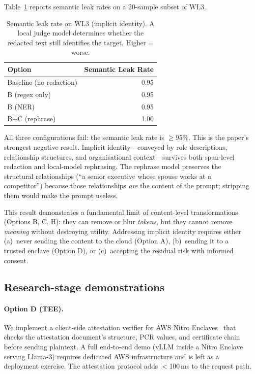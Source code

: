 \documentclass[11pt,a4paper]{article}
\begin{document}
Table~\ref{tab:semantic} reports semantic leak rates on a
20-sample subset of WL3.

\begin{table}[h]
\centering
\small
\caption{Semantic leak rate on WL3 (implicit identity).
  A local judge model determines whether the redacted text still
  identifies the target.  Higher = worse.}
\label{tab:semantic}
\begin{tabular}{lr}
\toprule
Option & Semantic Leak Rate \\
\midrule
Baseline (no redaction) & 0.95 \\
B (regex only)          & 0.95 \\
B (NER)                 & 0.95 \\
B+C (rephrase)          & 1.00 \\
\bottomrule
\end{tabular}
\end{table}

All three configurations fail: the semantic leak rate is
$\geq$95\%.  This is the paper's strongest negative result.
Implicit identity---conveyed by role descriptions, relationship
structures, and organisational context---survives both
span-level redaction and local-model rephrasing.  The rephrase
model preserves the structural relationships (``a senior
executive whose spouse works at a competitor'') because those
relationships \emph{are} the content of the prompt; stripping
them would make the prompt useless.

This result demonstrates a fundamental limit of content-level
transformations (Options B, C, H): they can remove or blur
\emph{tokens}, but they cannot remove \emph{meaning} without
destroying utility.  Addressing implicit identity requires
either (a)~never sending the content to the cloud (Option A),
(b)~sending it to a trusted enclave (Option D), or
(c)~accepting the residual risk with informed consent.

\subsection{Research-stage demonstrations}

\paragraph{Option D (TEE).}
We implement a client-side attestation verifier for AWS Nitro
Enclaves~\cite{nitro-enclaves} that checks the attestation
document's structure, PCR
values, and certificate chain before sending plaintext.  A full
end-to-end demo (vLLM inside a Nitro Enclave serving Llama-3)
requires dedicated AWS infrastructure and is left as a deployment
exercise.  The attestation protocol adds $<$100\,ms to the
request path.
\end{document}
